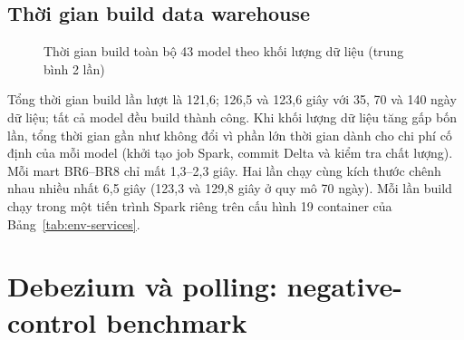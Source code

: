 \subsection{Thời gian build data warehouse}

\begin{figure}[H]
\centering
{}
\caption{Thời gian build toàn bộ 43 model theo khối lượng dữ liệu (trung bình 2 lần)}
\label{fig:build}
\end{figure}

Tổng thời gian build lần lượt là 121,6; 126,5 và 123,6 giây với 35, 70 và 140 ngày dữ liệu; tất cả model đều build thành công. Khi khối lượng dữ liệu tăng gấp bốn lần, tổng thời gian gần như không đổi vì phần lớn thời gian dành cho chi phí cố định của mỗi model (khởi tạo job Spark, commit Delta và kiểm tra chất lượng). Mỗi mart BR6--BR8 chỉ mất 1,3--2,3 giây. Hai lần chạy cùng kích thước chênh nhau nhiều nhất 6,5 giây (123,3 và 129,8 giây ở quy mô 70 ngày). Mỗi lần build chạy trong một tiến trình Spark riêng trên cấu hình 19 container của Bảng~\ref{tab:env-services}.

\section{Debezium và polling: negative-control benchmark}
\label{sec:cdc-comparison}

